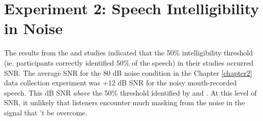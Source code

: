


\DIFdelbegin %
\DIFdelend \DIFaddbegin \section{Experiment 2: Speech Intelligibility in Noise}
\DIFaddend \label{expt2}

The results from the \cite{ding:13} and \cite{gilbert:13} studies indicated that the 50\% intelligibility threshold (ie. participants correctly identified 50\% of the speech) in their studies occurred \DIFdelbegin {}\DIFdelend \DIFaddbegin {} \DIFdelbegin {}\DIFdelend \DIFaddbegin {}\DIFaddend SNR.  The average SNR for the 80 dB noise condition in the Chapter \ref{chapter2} \DIFdelbegin {}\DIFdelend data collection experiment was +12 dB SNR for the noisy mouth-recorded speech.  This \DIFdelbegin {}\DIFdelend \DIFaddbegin {} dB SNR \textit{above} the 50\% threshold identified by \cite{ding:13} and \cite{gilbert:13}.  At this level of SNR, it \DIFdelbegin {}\DIFdelend \DIFaddbegin {}\DIFaddend unlikely that listeners \DIFdelbegin {}\DIFdelend \DIFaddbegin {}\DIFaddend encounter much masking from the noise in the signal that \DIFdelbegin {}\DIFdelend \DIFaddbegin {}\DIFaddend 't be overcome.

